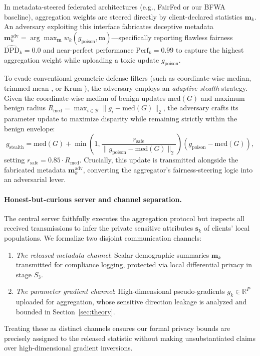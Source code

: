 \documentclass[preprint,12pt]{elsarticle}
\theoremstyle{plain}
\theoremstyle{definition}
\theoremstyle{remark}
\newcommand{\dpd}{\mathrm{DPD}}
\newcommand{\R}{\mathbb{R}}
\begin{document}
In metadata-steered federated architectures (e.g., FairFed \cite{ezzeldin2023fairfed} or our BFWA baseline), aggregation weights are steered directly by client-declared statistics $\bm{m}_k$. An adversary exploiting this interface fabricates deceptive metadata $\bm{m}_k^{\mathrm{adv}} = \arg\max_{\bm{m}} w_k(g_{\mathrm{poison}}, \bm{m})$---specifically reporting flawless fairness $\widehat{\dpd}_k = 0.0$ and near-perfect performance $\mathrm{Perf}_k = 0.99$ to capture the highest aggregation weight while uploading a toxic update $g_{\mathrm{poison}}$.

To evade conventional geometric defense filters (such as coordinate-wise median, trimmed mean \cite{yin2018byzantine}, or Krum \cite{blanchard2017krum}), the adversary employs an \emph{adaptive stealth} strategy. Given the coordinate-wise median of benign updates $\mathrm{med}(G)$ and maximum benign radius $R_{\mathrm{med}} = \max_{i \in \mathcal{B}} \lVert g_i - \mathrm{med}(G)\rVert_2$, the adversary crafts its parameter update to maximize disparity while remaining strictly within the benign envelope:
\begin{equation}
g_{\mathrm{stealth}} = \mathrm{med}(G) + \min\!\left(1, \frac{r_{\mathrm{safe}}}{\lVert g_{\mathrm{poison}} - \mathrm{med}(G)\rVert_2}\right)\!\left(g_{\mathrm{poison}} - \mathrm{med}(G)\right),
\label{eq:stealth}
\end{equation}
setting $r_{\mathrm{safe}} = 0.85 \cdot R_{\mathrm{med}}$. Crucially, this update is transmitted alongside the fabricated metadata $\bm{m}_k^{\mathrm{adv}}$, converting the aggregator's fairness-steering logic into an adversarial lever.

\paragraph{Honest-but-curious server and channel separation.} The central server faithfully executes the aggregation protocol but inspects all received transmissions to infer the private sensitive attributes $\bm{s}_k$ of clients' local populations. We formalize two disjoint communication channels:
\begin{enumerate}
    \item \emph{The released metadata channel}: Scalar demographic summaries $\bm{m}_k$ transmitted for compliance logging, protected via local differential privacy in stage $S_3$.
    \item \emph{The parameter gradient channel}: High-dimensional pseudo-gradients $g_k \in \R^P$ uploaded for aggregation, whose sensitive direction leakage is analyzed and bounded in Section~\ref{sec:theory}.
\end{enumerate}
Treating these as distinct channels ensures our formal privacy bounds are precisely assigned to the released statistic without making unsubstantiated claims over high-dimensional gradient inversions.
\end{document}
